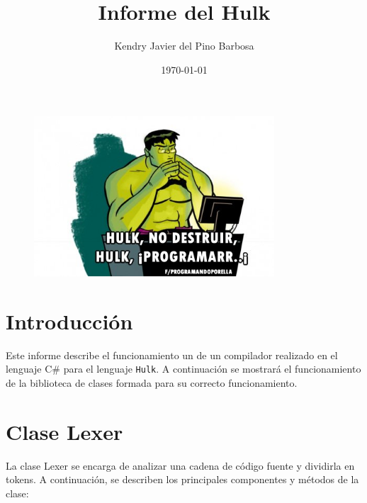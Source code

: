 \documentclass{article}
\title{Informe del Hulk}
\author{Kendry Javier del Pino Barbosa}
\date{\today}
\begin{document}
\begin{figure}
    \centering
    \includegraphics[width=0.8\textwidth]{Hulk.png}
    \label{fig:etiqueta_para_referencia_cruzada}
  \end{figure}

\maketitle

\section{Introducción}
Este informe describe el funcionamiento un de un compilador realizado en el lenguaje C\# para el lenguaje \lstinline{Hulk}. A continuación se mostrará el funcionamiento de la biblioteca de clases formada para su correcto funcionamiento. 
\section{Clase \textcolor{classcolor}{Lexer}}
La clase \textcolor{classcolor}{Lexer} se encarga de analizar una cadena de código fuente y dividirla en tokens. A continuación, se describen los principales componentes y métodos de la clase:
\end{document}
